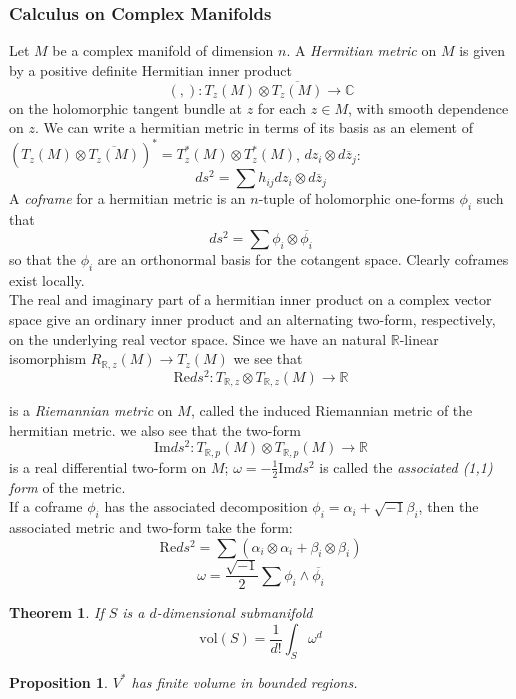 \documentclass{article}
\newtheorem{thm}{Theorem}
\newtheorem{prop}{Proposition}
\begin{document}
\subsubsection{Calculus on Complex Manifolds}

\indent Let $M$ be a complex manifold of dimension $n$. A \textit{Hermitian metric} on $M$ is given by a positive definite Hermitian inner product
\[
	\left( , \right) :  T_z(M) \otimes \overline{T_z (M)} \to \mathbb{C} 
\]
on the holomorphic tangent bundle at $z$ for each $z \in M$, with smooth dependence on $z$. We can write a hermitian metric in terms of its basis as an element of $ \left( T_z(M) \otimes \overline{T_z(M)} \right)^* = T^*_z (M) \otimes T^*_z(M)$, $dz_i \otimes d\overline{z}_j$:
\[
	ds^2 = \sum h_{ij} dz_i \otimes d \overline{z}_j
\]
A \textit{coframe} for a hermitian metric is an $n$-tuple of holomorphic one-forms $\phi_i$ such that
\[
	ds^2 = \sum \phi_i \otimes \overline{\phi_i}
\]
so that the $\phi_i$ are an orthonormal basis for the cotangent space. Clearly coframes exist locally. \\
\indent The real and imaginary part of a hermitian inner product on a complex vector space give an ordinary inner product and an alternating two-form, respectively, on the underlying real vector space. Since we have an natural $ \mathbb{R}$-linear isomorphism $ R_{ \mathbb{R},z}(M) \to T_z (M)$ we see that
\[
	\mathrm{Re} ds^2: T_{ \mathbb{R},z} \otimes T_{ \mathbb{R},z}(M) \to \mathbb{R}
\]

is a \textit{Riemannian metric} on $M$, called the induced Riemannian metric of the hermitian metric. we also see that the two-form
\[
	\mathrm{Im}ds^2: T_{ \mathbb{R},p}(M) \otimes T_{ \mathbb{R},p}(M) \to \mathbb{R}
\]
is a real differential two-form on $M$; $\omega = - \frac{1}{2} \mathrm{Im}ds^2$ is called the \textit{associated (1,1) form} of the metric.\\
\indent If a coframe $\phi_i$ has the associated decomposition $\phi_i = \alpha_i + \sqrt{-1} \beta_i$, then the associated metric and two-form take the form:
\[
	\mathrm{Re}ds^2 = \sum ( \alpha_i \otimes \alpha_i + \beta_i \otimes \beta_i)
\]
\[
	\omega = \frac{\sqrt{-1}}{2}\sum \phi_i \wedge \overline{\phi_i}
\]


\begin{thm}
If $S$ is a $d$-dimensional submanifold
\[
	\mathrm{vol}(S) = \frac{1}{d!}\int_S \omega^d
\]
\end{thm}


\begin{prop}

	$V^*$ has finite volume in bounded regions.

\end{prop}
\end{document}
